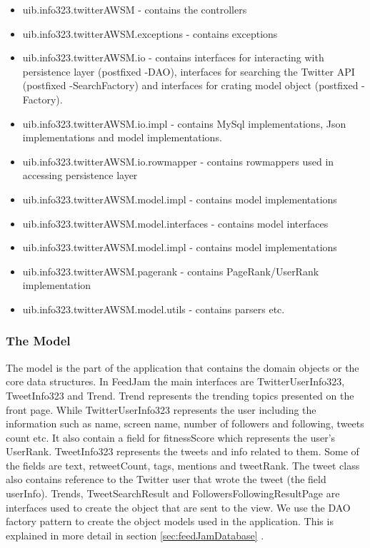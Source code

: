 \begin{itemize}
  \item uib.info323.twitterAWSM - contains the controllers
  \item uib.info323.twitterAWSM.exceptions - contains exceptions
  \item uib.info323.twitterAWSM.io - contains interfaces for interacting with persistence layer (postfixed -DAO), interfaces for searching the Twitter API (postfixed -SearchFactory) and interfaces for crating model object (postfixed -Factory).
  \item uib.info323.twitterAWSM.io.impl - contains MySql implementations, Json implementations and model implementations. 
  \item uib.info323.twitterAWSM.io.rowmapper - contains rowmappers used in accessing persistence layer
  \item uib.info323.twitterAWSM.model.impl - contains model implementations
  \item uib.info323.twitterAWSM.model.interfaces - contains model interfaces
  \item uib.info323.twitterAWSM.model.impl - contains model implementations
  \item uib.info323.twitterAWSM.pagerank - contains PageRank/UserRank implementation
  \item uib.info323.twitterAWSM.model.utils - contains parsers etc.
\end{itemize}

\subsubsection{The Model} %
The model is the part of the application that contains the domain objects or the core data structures. In FeedJam the main interfaces are TwitterUserInfo323, TweetInfo323 and Trend. Trend represents the trending topics presented on the front page. While TwitterUserInfo323 represents the user including the information such as name, screen name, number of followers and following, tweets count etc. It also contain a field for fitnessScore which represents the user's UserRank. TweetInfo323 represents the tweets and info related to them. Some of the fields are text, retweetCount, tags, mentions and tweetRank. The tweet class also contains reference to the Twitter user that wrote the tweet (the field userInfo). Trends, TweetSearchResult and FollowersFollowingResultPage are interfaces used to create the object that are sent to the view. We use the DAO factory pattern to create the object models used in the application. This is explained in more detail in section \ref{sec:feedJamDatabase} .

